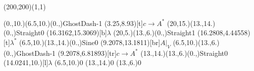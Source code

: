 \unitlength=1bp%

\begin{feynartspicture}(200,200)(1,1)

\FADiagram{}
\FAProp(0.,10.)(6.5,10.)(0.,){GhostDash}{-1}
\FALabel(3.25,8.93)[t]{$c\to A^*$}
\FAProp(20,15.)(13.,14.)(0.,){Straight}{0}
\FALabel(16.3162,15.3069)[b]{$\lambda$}
\FAProp(20,5.)(13.,6.)(0.,){Straight}{1}
\FALabel(16.2808,4.44558)[t]{$\lambda^*$}
\FAProp(6.5,10.)(13.,14.)(0.,){Sine}{0}
\FALabel(9.2078,13.1811)[br]{$A|_V$}
\FAProp(6.5,10.)(13.,6.)(0.,){GhostDash}{-1}
\FALabel(9.2078,6.81893)[tr]{$c\to A^*$}
\FAProp(13.,14.)(13.,6.)(0.,){Straight}{0}
\FALabel(14.0241,10.)[l]{$\lambda$}
\FAVert(6.5,10.){0}
\FAVert(13.,14.){0}
\FAVert(13.,6.){0}
\end{feynartspicture}

